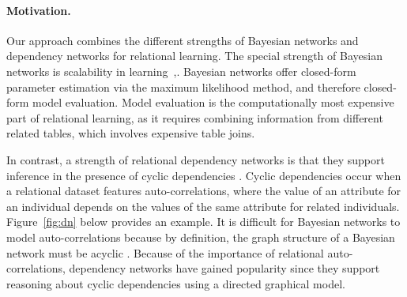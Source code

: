 \documentclass[runningheads,a4paper]{llncs}
\begin{document}
\paragraph{Motivation.} Our approach combines the different strengths of Bayesian networks and dependency networks for relational learning. The special strength of Bayesian networks is  scalability in learning~\cite[Sec.8.5.1]{Neville2007},\cite{Khosravi2010}. Bayesian networks offer closed-form parameter estimation via the maximum likelihood method, and therefore closed-form model evaluation. Model evaluation is the computationally most expensive part of relational learning, as it requires combining information from different related tables, which involves expensive table joins. 


In contrast, a strength of relational dependency networks is that they support inference in the presence of cyclic dependencies \cite{Neville2007,Natarajan2012}. 
Cyclic dependencies occur when a relational dataset features auto-correlations, where the value of an attribute for an individual depends on the values of the same attribute for related individuals. Figure~\ref{fig:dn} below provides an example. It is difficult for Bayesian networks to model auto-correlations because by definition, the graph structure of a Bayesian network must be acyclic \cite{Domingos2007,Taskar2002,Getoorprm2001}. Because of the importance of relational auto-correlations, dependency networks have gained popularity since they support reasoning about cyclic dependencies using a directed graphical model. 
\end{document}
